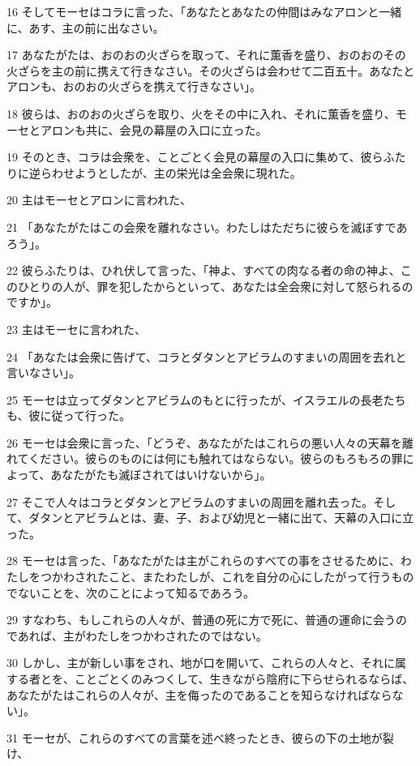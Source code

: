 \par 16 そしてモーセはコラに言った、「あなたとあなたの仲間はみなアロンと一緒に、あす、主の前に出なさい。
\par 17 あなたがたは、おのおの火ざらを取って、それに薫香を盛り、おのおのその火ざらを主の前に携えて行きなさい。その火ざらは会わせて二百五十。あなたとアロンも、おのおの火ざらを携えて行きなさい」。
\par 18 彼らは、おのおの火ざらを取り、火をその中に入れ、それに薫香を盛り、モーセとアロンも共に、会見の幕屋の入口に立った。
\par 19 そのとき、コラは会衆を、ことごとく会見の幕屋の入口に集めて、彼らふたりに逆らわせようとしたが、主の栄光は全会衆に現れた。
\par 20 主はモーセとアロンに言われた、
\par 21 「あなたがたはこの会衆を離れなさい。わたしはただちに彼らを滅ぼすであろう」。
\par 22 彼らふたりは、ひれ伏して言った、「神よ、すべての肉なる者の命の神よ、このひとりの人が、罪を犯したからといって、あなたは全会衆に対して怒られるのですか」。
\par 23 主はモーセに言われた、
\par 24 「あなたは会衆に告げて、コラとダタンとアビラムのすまいの周囲を去れと言いなさい」。
\par 25 モーセは立ってダタンとアビラムのもとに行ったが、イスラエルの長老たちも、彼に従って行った。
\par 26 モーセは会衆に言った、「どうぞ、あなたがたはこれらの悪い人々の天幕を離れてください。彼らのものには何にも触れてはならない。彼らのもろもろの罪によって、あなたがたも滅ぼされてはいけないから」。
\par 27 そこで人々はコラとダタンとアビラムのすまいの周囲を離れ去った。そして、ダタンとアビラムとは、妻、子、および幼児と一緒に出て、天幕の入口に立った。
\par 28 モーセは言った、「あなたがたは主がこれらのすべての事をさせるために、わたしをつかわされたこと、またわたしが、これを自分の心にしたがって行うものでないことを、次のことによって知るであろう。
\par 29 すなわち、もしこれらの人々が、普通の死に方で死に、普通の運命に会うのであれば、主がわたしをつかわされたのではない。
\par 30 しかし、主が新しい事をされ、地が口を開いて、これらの人々と、それに属する者とを、ことごとくのみつくして、生きながら陰府に下らせられるならば、あなたがたはこれらの人々が、主を侮ったのであることを知らなければならない」。
\par 31 モーセが、これらのすべての言葉を述べ終ったとき、彼らの下の土地が裂け、
